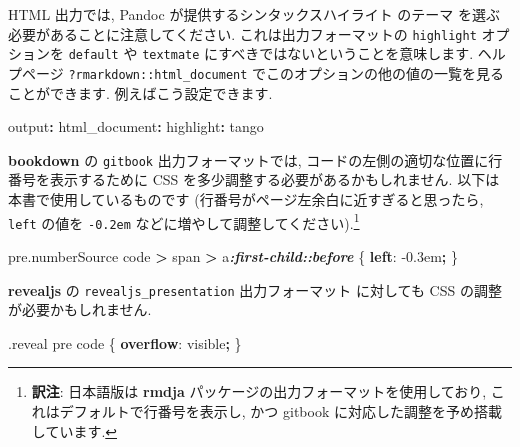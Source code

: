 \documentclass[
  11pt,
  lualatex,ja=standard,jafont=noto]{bxjsreport}
\newenvironment{Shaded}{\begin{snugshade}}{\end{snugshade}}
\newcommand{\AttributeTok}[1]{\textcolor[rgb]{0.77,0.63,0.00}{#1}}
\newcommand{\DataTypeTok}[1]{\textcolor[rgb]{0.13,0.29,0.53}{#1}}
\newcommand{\DecValTok}[1]{\textcolor[rgb]{0.00,0.00,0.81}{#1}}
\newcommand{\FunctionTok}[1]{\textcolor[rgb]{0.00,0.00,0.00}{#1}}
\newcommand{\InformationTok}[1]{\textcolor[rgb]{0.56,0.35,0.01}{\textbf{\textit{#1}}}}
\newcommand{\KeywordTok}[1]{\textcolor[rgb]{0.13,0.29,0.53}{\textbf{#1}}}
\newcommand{\NormalTok}[1]{#1}
\newcommand{\OperatorTok}[1]{\textcolor[rgb]{0.81,0.36,0.00}{\textbf{#1}}}
\begin{document}
HTML 出力では, Pandoc が提供するシンタックスハイライト のテーマ を選ぶ必要があることに注意してください. これは出力フォーマットの \texttt{highlight} オプションを \texttt{default} や \texttt{textmate} にすべきではないということを意味します. ヘルプページ \texttt{?rmarkdown::html\_document} でこのオプションの他の値の一覧を見ることができます. 例えばこう設定できます.

\begin{Shaded}
\begin{Highlighting}[]
\FunctionTok{output}\KeywordTok{:}
\AttributeTok{  }\FunctionTok{html\_document}\KeywordTok{:}
\AttributeTok{    }\FunctionTok{highlight}\KeywordTok{:}\AttributeTok{ tango}
\end{Highlighting}
\end{Shaded}

\textbf{bookdown} の \texttt{gitbook} 出力フォーマットでは, コードの左側の適切な位置に行番号を表示するために CSS を多少調整する必要があるかもしれません. 以下は本書で使用しているものです (行番号がページ左余白に近すぎると思ったら, \texttt{left} の値を \texttt{-0.2em} などに増やして調整してください).\footnote{\textbf{訳注}: 日本語版は \textbf{rmdja} パッケージの出力フォーマットを使用しており, これはデフォルトで行番号を表示し, かつ gitbook に対応した調整を予め搭載しています.}

\begin{Shaded}
\begin{Highlighting}[]
\NormalTok{pre}\FunctionTok{.numberSource}\NormalTok{ code }\OperatorTok{\textgreater{}}\NormalTok{ span }\OperatorTok{\textgreater{}}\NormalTok{ a}\InformationTok{:first{-}child::before}\NormalTok{ \{}
  \KeywordTok{left}\NormalTok{: }\DecValTok{{-}0.3}\DataTypeTok{em}\OperatorTok{;}
\NormalTok{\}}
\end{Highlighting}
\end{Shaded}

\textbf{revealjs} の \texttt{revealjs\_presentation} 出力フォーマット \autocite{R-revealjs} に対しても CSS の調整が必要かもしれません.

\begin{Shaded}
\begin{Highlighting}[]
\FunctionTok{.reveal}\NormalTok{ pre code \{}
  \KeywordTok{overflow}\NormalTok{: }\DecValTok{visible}\OperatorTok{;}
\NormalTok{\}}
\end{Highlighting}
\end{Shaded}
\end{document}
